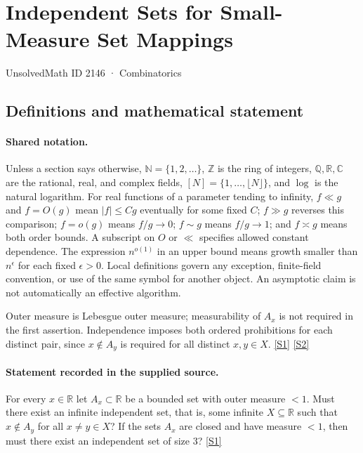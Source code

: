 \documentclass[11pt,a4paper]{article}
\newcommand{\N}{\mathbb{N}}
\newcommand{\Z}{\mathbb{Z}}
\newcommand{\Q}{\mathbb{Q}}
\newcommand{\R}{\mathbb{R}}
\newcommand{\C}{\mathbb{C}}
\newcommand{\sref}[2]{\hyperlink{source:#1:#2}{[S#2]}}
\begin{document}

\setcounter{section}{2145}

\section{Independent Sets for Small-Measure Set Mappings}\label{2146}

{\small\sffamily UnsolvedMath ID 2146 · Combinatorics}

\subsection{Definitions and mathematical statement}

\paragraph{Shared notation.}Unless a section says otherwise, $\N=\{1,2,\ldots\}$,
$\Z$ is the ring of integers, $\Q,\R,\C$ are the rational, real, and complex
fields, $[N]=\{1,\ldots,\lfloor N\rfloor\}$, and $\log$ is the natural
logarithm. For real functions of a parameter tending to infinity,
$f\ll g$ and $f=O(g)$ mean $|f|\leq Cg$ eventually for some fixed $C$;
$f\gg g$ reverses this comparison; $f=o(g)$ means $f/g\to0$;
$f\sim g$ means $f/g\to1$; and $f\asymp g$ means both order bounds.
A subscript on $O$ or $\ll$ specifies allowed constant dependence.
The expression $n^{o(1)}$ in an upper bound means growth smaller than
$n^\epsilon$ for each fixed $\epsilon>0$. Local definitions govern any
exception, finite-field convention, or use of the same symbol for another
object. An asymptotic claim is not automatically an effective algorithm.



Outer measure is Lebesgue outer measure; measurability of $A_x$ is not required in the first assertion. Independence imposes both ordered prohibitions for each distinct pair, since $x\notin A_y$ is required for all distinct $x,y\in X$. \sref{2146}{1} \sref{2146}{2}

\paragraph{Statement recorded in the supplied source.}
For every $x\in\mathbb{R}$ let $A_x\subset \mathbb{R}$ be a bounded set with outer measure $<1$. Must there exist an infinite independent set, that is, some infinite $X\subseteq \mathbb{R}$ such that $x\not\in A_y$ for all $x\neq y\in X$?
If the sets $A_x$ are closed and have measure $<1$, then must there exist an independent set of size $3$? \sref{2146}{1}
\end{document}
